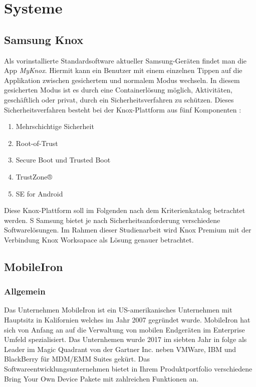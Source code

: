 \chapter{Systeme}
\label{cha:systeme}

\section{Samsung Knox}

Als vorinstallierte Standardsoftware aktueller Samsung-Geräten findet man die App \textit{MyKnox}. Hiermit kann ein Benutzer mit einem einzelnen Tippen auf die Applikation zwischen gesichertem und normalem Modus wechseln. In diesem gesicherten Modus ist es durch eine Containerlösung möglich, Aktivitäten, geschäftlich oder privat, durch ein Sicherheitsverfahren zu schützen. Dieses Sicherheitsverfahren besteht bei der Knox-Plattform aus fünf Komponenten \cite{sam2017}:
\begin{enumerate}
\item Mehrschichtige Sicherheit
\item Root-of-Trust
\item Secure Boot und Trusted Boot
\item TrustZone®
\item SE for Android
\end{enumerate}


  Diese Knox-Plattform soll im Folgenden nach dem Kriterienkatalog betrachtet werden.
S
Samsung bietet je nach Sicherheitsanforderung verschiedene Softwarelösungen. Im Rahmen dieser Studienarbeit wird Knox Premium mit der Verbindung Knox Worksapace als Lösung genauer betrachtet.



\section{MobileIron}

\subsection {Allgemein} 
Das Unternehmen MobileIron ist ein US-amerikanisches Unternehmen mit Hauptsitz in Kalifornien welches im Jahr 2007 gegründet wurde. MobileIron hat sich von Anfang an auf die Verwaltung von mobilen Endgeräten im Enterprise Umfeld spezialisiert. Das Unternhemen wurde 2017 im siebten Jahr in folge als Leader im Magic Quadrant von der Gartner Inc. neben VMWare, IBM und BlackBerry für MDM/EMM Suites gekürt. Das Softwareentwicklungsunternehmen bietet in Ihrem Produktportfolio verschiedene Bring Your Own Device Pakete mit zahlreichen Funktionen an. 

